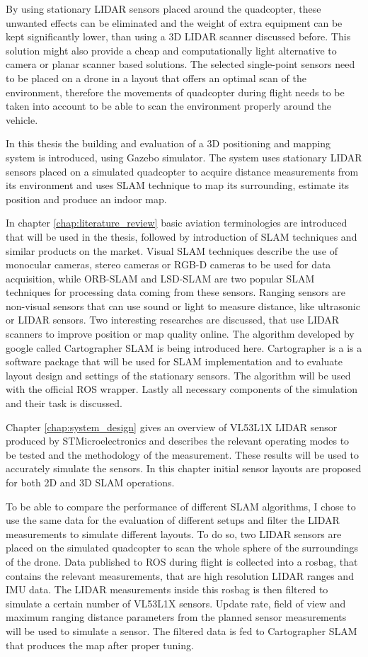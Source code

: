By using stationary LIDAR sensors placed around the quadcopter, these unwanted effects can be eliminated and the weight of 
extra equipment can be kept significantly lower, than using a 3D LIDAR scanner discussed before. This solution might also
provide a cheap and computationally light alternative to camera or planar scanner based solutions. 
The selected single-point sensors need to be placed on a drone in a layout that offers an optimal scan of the
environment, therefore the movements of quadcopter during flight needs to be taken into account to be able to scan the
environment properly around the vehicle.

In this thesis the building and evaluation of a 3D positioning and mapping system is introduced, using Gazebo simulator. 
The system uses stationary LIDAR sensors placed on a simulated quadcopter to acquire distance measurements from its 
environment and uses SLAM technique to map its surrounding, estimate its position and produce an indoor map. 

In chapter \ref{chap:literature_review} basic aviation terminologies are introduced that will be used in the thesis, followed
by introduction of SLAM techniques and similar products on the market. Visual SLAM techniques describe the use of monocular 
cameras, stereo cameras or RGB-D cameras to be used for data acquisition, while ORB-SLAM and LSD-SLAM are two popular SLAM
techniques for processing data coming from these sensors. Ranging sensors are non-visual sensors that can use sound
or light to measure distance, like ultrasonic or LIDAR sensors. Two interesting researches are discussed, that use 
LIDAR scanners to improve position or map quality online. The algorithm developed by google called Cartographer SLAM 
is being introduced here. Cartographer is a is a software package that will be used for SLAM implementation and to evaluate 
layout design and settings of the stationary sensors. The algorithm will be used with the official ROS wrapper.
Lastly all necessary components of the simulation and their task is discussed. 
 
Chapter \ref{chap:system_design} gives an overview of VL53L1X LIDAR sensor produced by STMicroelectronics and describes the
relevant operating modes to be tested and the methodology of the measurement. These results will be used to accurately simulate
the sensors. In this chapter initial sensor layouts are proposed for both 2D and 3D SLAM operations.

To be able to compare the performance of different SLAM algorithms, I chose to use the same data for the evaluation of 
different setups and filter the LIDAR measurements to simulate different layouts. 
To do so, two LIDAR sensors are placed on the simulated quadcopter to scan the whole sphere of the 
surroundings of the drone. Data published to ROS during flight is collected into a rosbag, that contains the relevant 
measurements, that are high resolution LIDAR ranges and IMU data. The LIDAR measurements inside this rosbag is then 
filtered to simulate a certain number of VL53L1X sensors. Update rate, field of view and maximum ranging distance parameters
from the planned sensor measurements will be used to simulate a sensor. The filtered data is fed to Cartographer SLAM
that produces the map after proper tuning. 

